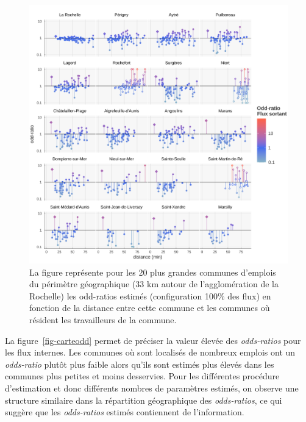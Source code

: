 \documentclass[
  10pt,
  a4paper,
  numbers=noendperiod,
  DIV=9]{scrartcl}
\begin{document}
\begin{figure}[htb]

{\centering \includegraphics[width=1\textwidth,height=\textheight]{output/spectre effectif par DCLT 100.png}

}

\caption[Odd-ratio par commune d'emploi fonction de la distance aux
communes de résidence (spectre emplois)]{\label{fig-spectreE}La figure
représente pour les 20 plus grandes communes d'emplois du périmètre
géographique (33 km autour de l'agglomération de la Rochelle) les
odd-ratios estimés (configuration 100\% des flux) en fonction de la
distance entre cette commune et les communes où résident les
travailleurs de la commune.}

\end{figure}

La figure~\ref{fig-carteodd} permet de préciser la valeur élevée des
\emph{odds-ratios} pour les flux internes. Les communes où sont
localisés de nombreux emplois ont un \emph{odds-ratio} plutôt plus
faible alors qu'ils sont estimés plus élevés dans les communes plus
petites et moins desservies. Pour les différentes procédure d'estimation
et donc différents nombres de paramètres estimés, on observe une
structure similaire dans la répartition géographique des
\emph{odds-ratios}, ce qui suggère que les \emph{odds-ratios} estimés
contiennent de l'information.
\end{document}
